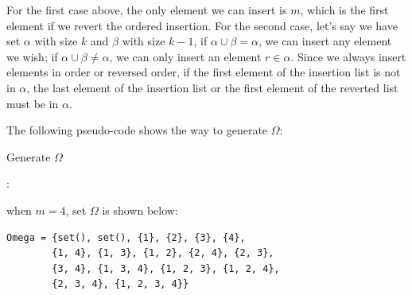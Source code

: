 \documentclass[11pt]{article}
\begin{document}
For the first case above, the only element we can insert is $m$, which is the first element if we revert the ordered insertion. For the second case, let's say we have set $\alpha$ with size $k$ and $\beta$ with size $k-1$, if $\alpha \cup \beta = \alpha$, we can insert any element we wish; if $\alpha \cup \beta \neq \alpha$, we can only insert an element $r \in \alpha$. Since we always insert elements in order or reversed order, if the first element of the insertion list is not in $\alpha$, the last element of the insertion list or the first element of the reverted list must be in $\alpha$.

The following pseudo-code shows the way to generate $\Omega$: 

\begin{algorithm}[H] 
    \caption{Generate $\Omega$}
    \label{alg:loop}
    \begin{algorithmic}[1]
    \Ensure{$\Omega$}
                :
                \EndIf
                     
                \EndFor
            \EndFor
        \EndFor
        \State \Return {$\Omega$}
    \end{algorithmic}
\end{algorithm}

when $m=4$, set $\Omega$ is shown below:
\begin{lstlisting}
Omega = {set(), set(), {1}, {2}, {3}, {4}, 
        {1, 4}, {1, 3}, {1, 2}, {2, 4}, {2, 3}, 
        {3, 4}, {1, 3, 4}, {1, 2, 3}, {1, 2, 4}, 
        {2, 3, 4}, {1, 2, 3, 4}}
\end{lstlisting}


\end{document}
